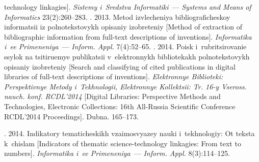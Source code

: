 \begin{multicols}{2}
{{\begin{thebibliography}{99}
technology linkagies]. \textit{Sistemy i~Sredstva Informatiki}~--- \textit{Systems and Means of 
Informatics} 23(2):260--283.
. 2013. Metod izvlecheniya 
bibliograficheskoy in\-for\-ma\-tsii iz polnotekstovykh opisaniy izobreteniy [Method of extraction of 
bibliographic information from full-text descriptions of inventions]. \textit{Informatika i~ee 
Primeneniya}~--- \textit{Inform. Appl.} 7(4):52--65.
. 2014. Poisk i~rub\-ri\-tsi\-ro\-vanie ssylok na tsitiruemye 
publikatsii v~elektronnykh bibliotekakh polnotekstovykh opisaniy izobreteniy [Search and classifying 
of cited publications in digital libraries of full-text descriptions of inventions]. \textit{Elektronnye 
Biblioteki: Perspektivnye Metody i~Tekhnologii, Elektronnye Kollektsii: Tr. 16-y 
Vseross. nauch. 
konf. RCDL'2014} [Digital Libraries: Perspective Methods and Technologies, Electronic Collections: 
16th All-Russia Scientific Conference RCDL'2014 Proceedings]. Dubna. 165--173.

\columnbreak 

. 2014. Indikatory 
tematicheskikh vzaimosvyazey nauki i~tekhnologiy: Ot teksta k~chislam [Indicators of thematic 
science-technology linkagies: From text to numbers]. \textit{Informatika i~ee Primeneniya}~--- 
\textit{Inform. Appl.} 8(3):114--125.



\end{thebibliography}}}
\end{multicols}
